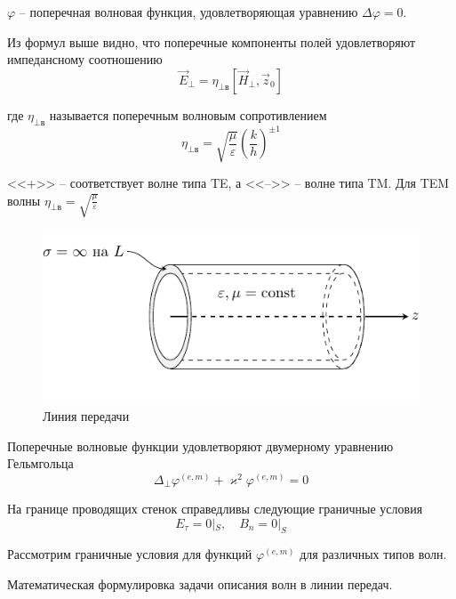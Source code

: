 \documentclass[a4paper,14pt]{extarticle}
\DeclareMathOperator{\Const}{const}
\renewcommand{\phi}{\varphi}
\renewcommand{\epsilon}{\varepsilon}
\renewcommand{\kappa}{\varkappa}
\begin{document}
	$\phi$ -- поперечная волновая функция, удовлетворяющая уравнению $\Delta\phi=0$.
	
	Из формул выше видно, что поперечные компоненты полей удовлетворяют импедансному соотношению
	$$\vec{E}_\perp = \eta_{\perp\text{в}}[\vec{H}_\perp,\vec{z}_0]$$
	
	где $\eta_{\perp\text{в}}$ называется поперечным волновым сопротивлением
	$$\eta_{\perp\text{в}}=\sqrt{\frac{\mu}{\epsilon}} \left( \frac{k}{h} \right)^{\pm 1}$$ 
	
	<<+>> -- соответствует волне типа TE, а <<-->> -- волне типа TM. Для TEM волны $\displaystyle \eta_{\perp\text{в}}=\sqrt{\frac{\mu}{\epsilon}}$
	
	\newpage
	\hypertarget{num4}{}
	\begin{figure}[h!]
		\centering
		\includegraphics[scale=1.5]{img/lect2_ris1}
		\caption{Линия передачи}
		\label{fig:wavegain:1}
	\end{figure}
	Поперечные волновые функции удовлетворяют двумерному уравнению Гельмгольца
	$$\Delta_\perp\phi^{(e,m)}+\kappa^2\phi^{(e,m)}=0$$
	
	На границе проводящих стенок справедливы следующие граничные условия
	$$E_\tau = 0 |_S, \quad B_n = 0 |_S$$
	
	Рассмотрим граничные условия для функций $\phi^{(e,m)}$ для различных типов волн.
	
%	
%	
%	
%	
%	
%	
%
%	
%	
%	
%	
%	
	Математическая формулировка задачи описания волн в линии передач.
	
\end{document}
